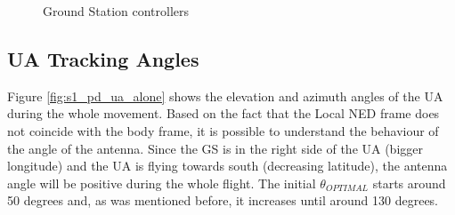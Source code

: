 \begin{figure}[H]
	\hfill
	\hfill
	\caption{Ground Station controllers}
	\label{fig:s1_gs}
\end{figure}

\subsection*{UA Tracking Angles}
Figure \ref{fig:s1_pd_ua_alone} shows the elevation and azimuth angles of the UA during the whole movement. Based on the fact that the Local NED frame does not coincide with the body frame, it is possible to understand the behaviour of the angle of the antenna. Since the GS is in the right side of the UA (bigger longitude) and the UA is flying towards south (decreasing latitude), the antenna angle will be positive during the whole flight.
The initial $\theta_{OPTIMAL}$ starts around 50 degrees and, as was mentioned before, it increases until around 130 degrees.


